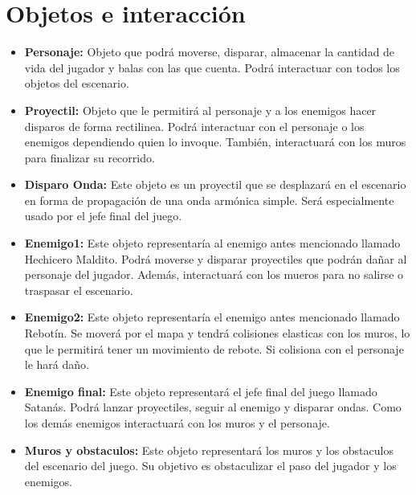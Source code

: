 \documentclass{article}
\begin{document}
\section{Objetos e interacción}
\begin{itemize}
    \item {\textbf{Personaje:}} Objeto que podrá moverse, disparar, almacenar la cantidad de vida del jugador y balas con las que cuenta. Podrá interactuar con todos los objetos del escenario.  
\end{itemize}
\begin{itemize}
    \item {\textbf{Proyectil:}} Objeto que le permitirá al personaje y a los enemigos hacer disparos de forma rectilinea. Podrá interactuar con el personaje o los enemigos dependiendo quien lo invoque. También, interactuará con los muros para finalizar su recorrido.  
\end{itemize}
\begin{itemize}
    \item {\textbf{Disparo Onda:}} Este objeto es un proyectil que se desplazará en el escenario en forma de propagación de una onda armónica simple. Será especialmente usado por el jefe final del juego. 
\end{itemize}
\begin{itemize}
    \item {\textbf{Enemigo1:}} Este objeto representaría al enemigo antes mencionado llamado Hechicero Maldito. Podrá moverse y disparar proyectiles que podrán dañar al personaje del jugador. Además, interactuará con los mueros para no salirse o traspasar el escenario. 
\end{itemize}
\begin{itemize}
    \item {\textbf{Enemigo2:}} Este objeto representaría el enemigo antes mencionado llamado Rebotín. Se moverá por el mapa y tendrá colisiones elasticas con los muros, lo que le permitirá tener un movimiento de rebote. Si colisiona con el personaje le hará daño. 
\end{itemize}
\begin{itemize}
    \item {\textbf{Enemigo final:}} Este objeto representará el jefe final del juego llamado Satanás. Podrá lanzar proyectiles, seguir al enemigo y disparar ondas. Como los demás enemigos interactuará con los muros y el personaje.  
\end{itemize}
\begin{itemize}
    \item {\textbf{Muros y obstaculos:}} Este objeto representará los muros y los obstaculos del escenario del juego. Su objetivo es obstaculizar el paso del jugador y los enemigos.  
\end{itemize}
\end{document}
